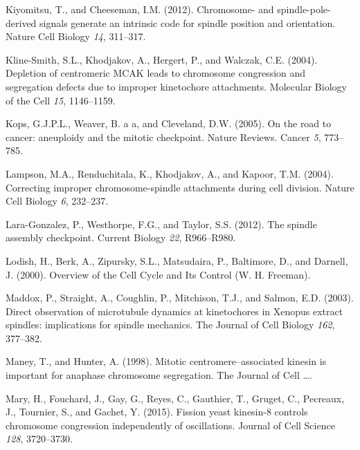 \documentclass[12pt,a4paper,twoside,openright]{book}
\begin{document}
Kiyomitsu, T., and Cheeseman, I.M. (2012). Chromosome- and
spindle-pole-derived signals generate an intrinsic code for spindle
position and orientation. Nature Cell Biology \emph{14}, 311--317.

Kline-Smith, S.L., Khodjakov, A., Hergert, P., and Walczak, C.E. (2004).
Depletion of centromeric MCAK leads to chromosome congression and
segregation defects due to improper kinetochore attachments. Molecular
Biology of the Cell \emph{15}, 1146--1159.

Kops, G.J.P.L., Weaver, B. a a, and Cleveland, D.W. (2005). On the road
to cancer: aneuploidy and the mitotic checkpoint. Nature Reviews. Cancer
\emph{5}, 773--785.

Lampson, M.A., Renduchitala, K., Khodjakov, A., and Kapoor, T.M. (2004).
Correcting improper chromosome-spindle attachments during cell division.
Nature Cell Biology \emph{6}, 232--237.

Lara-Gonzalez, P., Westhorpe, F.G., and Taylor, S.S. (2012). The spindle
assembly checkpoint. Current Biology \emph{22}, R966--R980.

Lodish, H., Berk, A., Zipursky, S.L., Matsudaira, P., Baltimore, D., and
Darnell, J. (2000). Overview of the Cell Cycle and Its Control (W. H.
Freeman).

Maddox, P., Straight, A., Coughlin, P., Mitchison, T.J., and Salmon,
E.D. (2003). Direct observation of microtubule dynamics at kinetochores
in Xenopus extract spindles: implications for spindle mechanics. The
Journal of Cell Biology \emph{162}, 377--382.

Maney, T., and Hunter, A. (1998). Mitotic centromere--associated kinesin
is important for anaphase chromosome segregation. The Journal of Cell
\ldots{}.

Mary, H., Fouchard, J., Gay, G., Reyes, C., Gauthier, T., Gruget, C.,
Pecreaux, J., Tournier, S., and Gachet, Y. (2015). Fission yeast
kinesin-8 controls chromosome congression independently of oscillations.
Journal of Cell Science \emph{128}, 3720--3730.
\end{document}
